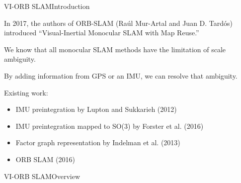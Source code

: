 \documentclass[aspectratio=169]{beamer}
\newcommand{\myfig}[3]{\centerline{\texttt{[image: \#2]}}
    \centerline{\scriptsize \begin{minipage}{#1} \centering #3 \end{minipage}}}
\begin{document}
\begin{frame}{VI-ORB SLAM}{Introduction}

In 2017, the authors of ORB-SLAM
(Ra\'{u}l Mur-Artal and Juan D. Tard\'{o}s)
introduced ``Visual-Inertial Monocular SLAM with Map Reuse.''

\medskip

We know that all
monocular SLAM methods
have the limitation of \alert{scale ambiguity}.

\medskip

By adding information from GPS or an IMU, we can resolve that ambiguity.

\medskip

Existing work:
\begin{itemize}
\item IMU preintegration by Lupton and Sukkarieh (2012)
\item IMU preintegration mapped to SO(3) by Forster et al. (2016)
\item Factor graph representation by Indelman et al. (2013)
\item ORB SLAM (2016)
\end{itemize}

\end{frame}


\begin{frame}{VI-ORB SLAM}{Overview}


\end{frame}
\end{document}
